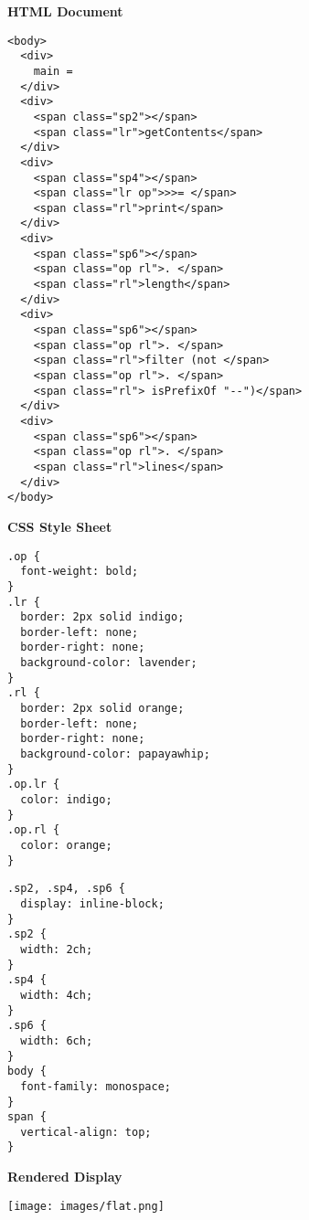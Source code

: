\documentclass[acmsmall, screen]{acmart}
\begin{document}
\begin{figure}[h]

\scriptsize

\newcommand{\subheader}[1]
{\begin{flushleft}\textbf{#1} \\[0.05in]\end{flushleft}}

\begin{minipage}[t]{.42\textwidth} \subheader{HTML Document}
\begin{Verbatim}[commandchars=\\\{\}]
<body>
  <div>
    main =
  </div>
  <div>
    <span class="sp2"></span>
    <span class="lr">getContents</span>
  </div>
  <div>
    <span class="sp4"></span>
    <span class="lr op">>>= </span>
    <span class="rl">print</span>
  </div>
  <div>
    <span class="sp6"></span>
    <span class="op rl">. </span>
    <span class="rl">length</span>
  </div>
  <div>
    <span class="sp6"></span>
    <span class="op rl">. </span>
    <span class="rl">filter (not </span>
    <span class="op rl">. </span>
    <span class="rl"> isPrefixOf "--")</span>
  </div>
  <div>
    <span class="sp6"></span>
    <span class="op rl">. </span>
    <span class="rl">lines</span>
  </div>
</body>
\end{Verbatim}
\end{minipage} \begin{minipage}[t]{.57\textwidth} \subheader{CSS Style Sheet}
  \begin{minipage}[t]{0.5\textwidth}
\begin{Verbatim}
.op {
  font-weight: bold;
}
.lr {
  border: 2px solid indigo;
  border-left: none;
  border-right: none;
  background-color: lavender;
}
.rl {
  border: 2px solid orange;
  border-left: none;
  border-right: none;
  background-color: papayawhip;
}
.op.lr {
  color: indigo;
}
.op.rl {
  color: orange;
}
\end{Verbatim}
  \end{minipage}
  \begin{minipage}[t]{0.49\textwidth}
\begin{Verbatim}
.sp2, .sp4, .sp6 {
  display: inline-block;
}
.sp2 {
  width: 2ch;
}
.sp4 {
  width: 4ch;
}
.sp6 {
  width: 6ch;
}
body {
  font-family: monospace;
}
span {
  vertical-align: top;
}
\end{Verbatim}
  \end{minipage}
  \vspace{0.05in}
  \subheader{Rendered Display}
  \texttt{[image: images/flat.png]}


\end{minipage}
\end{figure}
\end{document}
